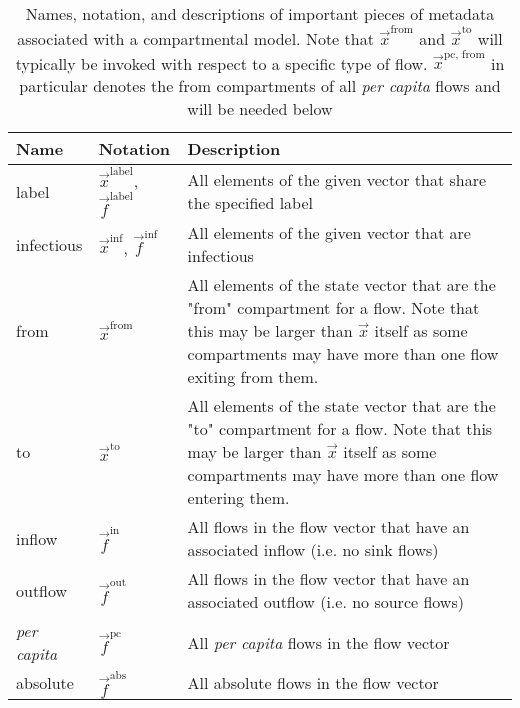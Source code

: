 \documentclass[pdflatex,sn-basic]{sn-jnl}%
\theoremstyle{definition}
\newcommand{\xvec}{\vec{x}}
\newcommand{\fvec}{\vec{f}}
\begin{document}
\begin{table}
\centering
    \begin{tabular}{|m{1.5cm}|m{1.5cm}|m{30em}|}
        \hline
        Name & Notation & Description \\\hline
        label & $\xvec^{\text{label}}$, $\fvec^{\text{label}}$ & All elements of the given vector that share the specified label \\\hline
        infectious & $\xvec^{\text{inf}}$, $\fvec^{\text{inf}}$ & All elements of the given vector that are infectious \\\hline
        from & $\xvec^\text{from}$ & All elements of the state vector that are the "from" compartment for a flow. Note that this may be larger than $\xvec$ itself as some compartments may have more than one flow exiting from them. \\\hline
        to & $\xvec^\text{to}$ & All elements of the state vector that are the "to" compartment for a flow. Note that this may be larger than $\xvec$ itself as some compartments may have more than one flow entering them. \\\hline
        inflow & $\fvec^\text{in}$ & All flows in the flow vector that have an associated inflow (i.e. no sink flows) \\\hline
        outflow & $\fvec^\text{out}$ & All flows in the flow vector that have an associated outflow (i.e. no source flows) \\\hline
        \emph{per capita} & $\fvec^\text{pc}$ & All \emph{per capita} flows in the flow vector \\\hline
        absolute & $\fvec^\text{abs}$ & All absolute flows in the flow vector \\\hline
    \end{tabular}
    \caption{Names, notation, and descriptions of important pieces of metadata associated with a compartmental model. Note that $\xvec^\text{from}$ and $\xvec^\text{to}$ will typically be invoked with respect to a specific type of flow. $\xvec^\text{pc, from}$ in particular denotes the from compartments of all \emph{per capita} flows and will be needed below}
    \label{tab:projections}
\end{table}
    
\end{document}
